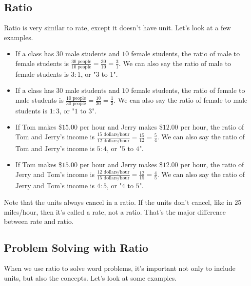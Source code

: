 \subsection{Ratio}
Ratio is very similar to rate, except it doesn't have unit. Let's look at a few examples.

\begin{itemize}
\item If a class has $30$ male students and $10$ female students, the ratio of male to female students is $\frac{30 \text{ people}}{10 \text{ people}}=\frac{30}{10}=\frac{3}{1}$. We can also say the ratio of male to female students is $3:1$, or "$3$ to $1$".
\item If a class has $30$ male students and $10$ female students, the ratio of female to male students is $\frac{10 \text{ people}}{30 \text{ people}}=\frac{10}{30}=\frac{1}{3}$. We can also say the ratio of female to male students is $1:3$, or "$1$ to $3$".
\item If Tom makes \$$15.00$ per hour and Jerry makes \$$12.00$ per hour, the ratio of Tom and Jerry's income is $\frac{15 \text{ dollars/hour}}{12 \text{ dollars/hour}}=\frac{15}{12}=\frac{5}{4}$. We can also say the ratio of Tom and Jerry's income is $5:4$, or "$5$ to $4$".
\item If Tom makes \$$15.00$ per hour and Jerry makes \$$12.00$ per hour, the ratio of Jerry and Tom's income is $\frac{12 \text{ dollars/hour}}{15 \text{ dollars/hour}}=\frac{12}{15}=\frac{4}{5}$. We can also say the ratio of Jerry and Tom's income is $4:5$, or "$4$ to $5$".
\end{itemize}

Note that the units always cancel in a ratio. If the units don't cancel, like in $25$ miles/hour, then it's called a rate, not a ratio. That's the major difference between rate and ratio.

\subsection{Problem Solving with Ratio}
When we use ratio to solve word problems, it's important not only to include units, but also the concepts. Let's look at some examples.

